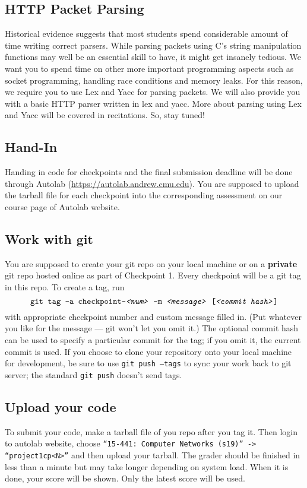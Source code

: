 \subsection{HTTP Packet Parsing}
Historical evidence suggests that most students spend considerable
amount of time writing correct parsers. While parsing packets using
C's string manipulation functions may well be an essential skill to
have, it might get insanely tedious. We want you to spend time on
other more important programming aspects such as socket programming,
handling race conditions and memory leaks. For this reason, we require you to use Lex and Yacc for parsing packets. We will also provide you with a basic HTTP parser written in lex and yacc. More about parsing
using Lex and Yacc will be covered in recitations. So, stay tuned!


\subsection{Hand-In}
\label{sec:handin}
Handing in code for checkpoints and the final submission deadline will be done
through Autolab (\url{https://autolab.andrew.cmu.edu}).  You are supposed to upload the tarball file for each checkpoint into the corresponding assessment on our course page of Autolab website.

\subsection{Work with git}
You are supposed to create your git repo on your local machine or on a \textbf{private} git repo hosted
online as part of
Checkpoint 1. Every checkpoint will be a git tag in this repo. To create a tag, run
\[
\texttt{git tag -a checkpoint-\textit{<num>} -m \textit{<message>} [\textit{<commit hash>}]}
\]
with appropriate checkpoint number and custom message filled in. (Put whatever
you like for the message --- git won't let you omit it.) The optional commit
hash can be used to specify a particular commit for the tag; if you omit it,
the current commit is used. If you choose to clone your repository onto your
local machine for development, be sure to use \texttt{git push --tags} to sync
your work back to git server; the standard \texttt{git push} doesn't send tags.

\subsection{Upload your code}
To submit your code, make a tarball file of you repo after you tag it. Then login to autolab website, choose \texttt{“15-441: Computer Networks (s19)” -> “project1cp\textit{<N>}”} and then upload your tarball. The grader should be finished in less than a minute but may take longer depending on system load. When it is done, your score will be shown. Only the latest score will be used.\\


